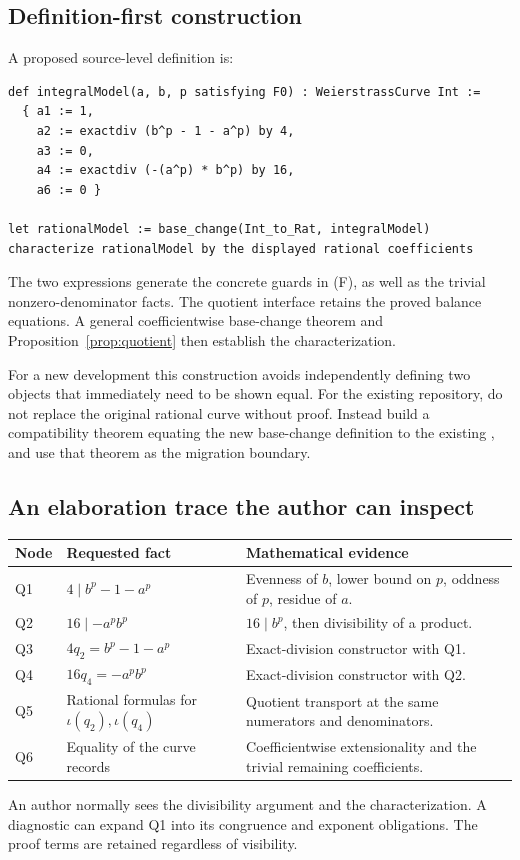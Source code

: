 \documentclass[11pt,letterpaper]{article}
\theoremstyle{definition}\newtheorem{definition}[theorem]{Definition}
\newcommand{\code}[1]{\texttt{\detokenize{#1}}}
\begin{document}
\subsection{Definition-first construction}
A proposed source-level definition is:
\begin{lstlisting}
def integralModel(a, b, p satisfying F0) : WeierstrassCurve Int :=
  { a1 := 1,
    a2 := exactdiv (b^p - 1 - a^p) by 4,
    a3 := 0,
    a4 := exactdiv (-(a^p) * b^p) by 16,
    a6 := 0 }

let rationalModel := base_change(Int_to_Rat, integralModel)
characterize rationalModel by the displayed rational coefficients
\end{lstlisting}
The two \code{exactdiv} expressions generate the concrete guards in (F), as well as the trivial nonzero-denominator facts. The quotient interface retains the proved balance equations. A general coefficientwise base-change theorem and Proposition~\ref{prop:quotient} then establish the characterization.

For a new development this construction avoids independently defining two objects that immediately need to be shown equal. For the existing repository, do not replace the original rational curve without proof. Instead build a compatibility theorem equating the new base-change definition to the existing \code{freyCurve}, and use that theorem as the migration boundary.

\subsection{An elaboration trace the author can inspect}
\begin{center}\small
\begin{tabularx}{\textwidth}{@{}L{0.6in}YY@{}}
\toprule
Node & Requested fact & Mathematical evidence\\\midrule
Q1 & $4\mid b^p-1-a^p$ & Evenness of $b$, lower bound on $p$, oddness of $p$, residue of $a$.\\
Q2 & $16\mid-a^pb^p$ & $16\mid b^p$, then divisibility of a product.\\
Q3 & $4q_2=b^p-1-a^p$ & Exact-division constructor with Q1.\\
Q4 & $16q_4=-a^pb^p$ & Exact-division constructor with Q2.\\
Q5 & Rational formulas for $\iota(q_2),\iota(q_4)$ & Quotient transport at the same numerators and denominators.\\
Q6 & Equality of the curve records & Coefficientwise extensionality and the trivial remaining coefficients.\\
\bottomrule
\end{tabularx}
\end{center}
An author normally sees the divisibility argument and the characterization. A diagnostic can expand Q1 into its congruence and exponent obligations. The proof terms are retained regardless of visibility.
\end{document}
